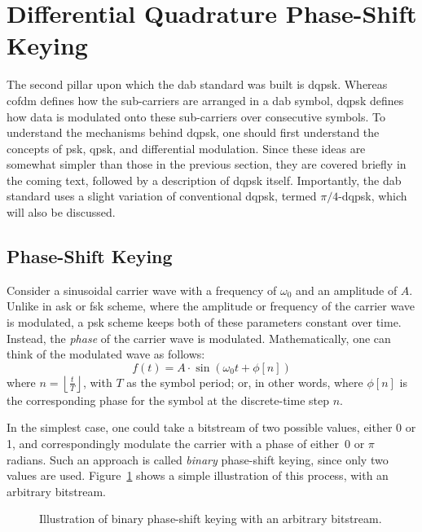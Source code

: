 \documentclass[class=report,11pt,crop=false]{standalone}
\begin{document}
\section{Differential Quadrature Phase-Shift Keying \label{sect:dab-std_psk}}
The second pillar upon which the \gls{dab} standard was built is \gls{dqpsk}. Whereas \gls{cofdm} defines how the sub-carriers are arranged in a \gls{dab} symbol, \gls{dqpsk} defines how data is modulated onto these sub-carriers over consecutive symbols. To understand the mechanisms behind \gls{dqpsk}, one should first understand the concepts of \gls{psk}, \gls{qpsk}, and differential modulation. Since these ideas are somewhat simpler than those in the previous section, they are covered briefly in the coming text, followed by a description of \gls{dqpsk} itself. Importantly, the \gls{dab} standard uses a slight variation of conventional \gls{dqpsk}, termed \(\pi/4\)-\gls{dqpsk}, which will also be discussed.

\subsection{Phase-Shift Keying}
Consider a sinusoidal carrier wave with a frequency of \(\omega_0\) and an amplitude of \(A\). Unlike in \gls{ask} or \gls{fsk} scheme, where the amplitude or frequency of the carrier wave is modulated, a \gls{psk} scheme keeps both of these parameters constant over time. Instead, the \emph{phase} of the carrier wave is modulated. Mathematically, one can think of the modulated wave as follows:
\begin{equation}
    f(t) = A \cdot \sin(\omega_0t + \phi[n])
\end{equation}
where \(n=\left\lfloor \frac{t}{T} \right\rfloor\), with \(T\) as the symbol period; or, in other words, where \(\phi[n]\) is the corresponding phase for the symbol at the discrete-time step \(n\).

In the simplest case, one could take a bitstream of two possible values, either 0 or 1, and correspondingly modulate the carrier with a phase of either~\(0\) or \(\pi\) radians. Such an approach is called \emph{binary} phase-shift keying, since only two values are used. Figure~\ref{fig:binary-psk} shows a simple illustration of this process, with an arbitrary bitstream.

\begin{figure}[htbp]
    \centering
    \captionsetup{type=figure}
    \def\svgwidth{1\linewidth}
    {\scriptsize
        }
    \caption{Illustration of binary phase-shift keying with an arbitrary bitstream.}
    \label{fig:binary-psk}
\end{figure}
\end{document}
